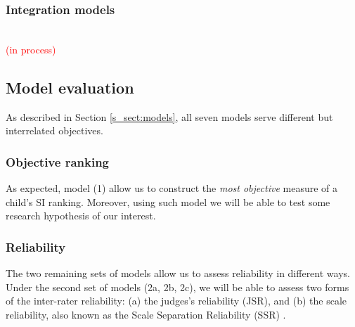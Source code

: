 \begin{comment}
	
	Identification of model:  
	soft identification (see \citet{Depaoli_2021}) 
	
	Considering the intelligibility of any stimulus is determined by three interrelated parties: the message, speaker, and listener, and that the inherent variability within each integrating part could be high, the current research assumes the utterances are equivalent among each other.
	
	It will consider the correlation with the entropy measure.
	\begin{enumerate}
		\item \textbf{Dichotomous CJ (CJ-D):} the Bradley-Terry-Luce model (BTL) \citep{Bradley_et_al_1952, Luce_1959}, used when the comparative judgments are dichotomous (CJ-D), 
		\item \textbf{Ordinal CJ (CJ-O):} the Generalized Bradley-Terry-Luce model BTL(k) \citep{Tutz_1986, Agresti_1992}, used when the comparative ordinal CJ (CJ-O).
		\item \textbf{Absolute (holistic) judgments (HJ):}
	\end{enumerate}
\end{comment}
%
%
\subsubsection{Integration models} \\
%
\textcolor{red}{(in process)} \\
%
%
\subsection{Model evaluation} \label{s_sect:evaluation}
%
As described in Section \ref{s_sect:models}, all seven models serve different but interrelated objectives.
%
%
\subsubsection{Objective ranking}
%
As expected, model (1) allow us to construct the \textit{most objective} measure of a child's SI ranking. Moreover, using such model we will be able to test some research hypothesis of our interest.
%
%
\subsubsection{Reliability}
%
The two remaining sets of models allow us to assess reliability in different ways. Under the second set of models (2a, 2b, 2c), we will be able to assess two forms of the inter-rater reliability: (a) the judges's reliability (JSR), and (b) the scale reliability, also known as the Scale Separation Reliability (SSR) \citep{Bramley_2015}. 

